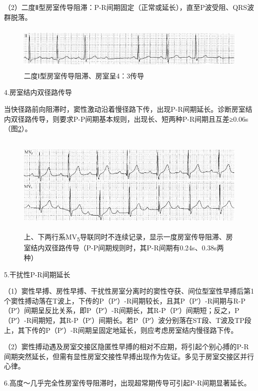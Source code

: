 （2）二度Ⅱ型房室传导阻滞：P-R间期固定（正常或延长），直至P波受阻、QRS波群脱落。

\begin{figure}[!htbp]
 \centering
 \includegraphics[width=5.58333in,height=0.83333in]{./images/Image00045.jpg}
 \captionsetup{justification=centering}
 \caption{二度Ⅰ型房室传导阻滞、房室呈4：3传导}
 \label{fig2-10}
  \end{figure} 

4.房室结内双径路传导

当快径路前向阻滞时，窦性激动沿着慢径路下传，出现P-R间期延长。诊断房室结内双径路传导，则要求P-P间期基本规则，出现长、短两种P-R间期且互差≥0.06s（图\ref{fig2-11}）。

\begin{figure}[!htbp]
 \centering
 \includegraphics[width=5.58333in,height=1.875in]{./images/Image00046.jpg}
 \captionsetup{justification=centering}
 \caption{上、下两行系MV\textsubscript{5}导联同时不连续记录，显示一度房室传导阻滞、房室结内双径路传导（P-P间期规则时，其P-R间期有0.24s、0.38s两种）}
 \label{fig2-11}
  \end{figure} 


5.干扰性P-R间期延长

（1）窦性早搏、房性早搏、干扰性房室分离时的窦性夺获、间位型室性早搏后第1个窦性搏动落在T波上，下传的P（P′）-R间期较长，且其P（P′）-R间期与R-P（P′）间期呈反比关系，即P（P′）-R间期长，其R-P（P′）间期短；反之，P（P′）-R间期短，其R-P（P′）间期长。若P（P′）波分别落在ST段、T波及TP段上，其下传的P（P′）-R间期呈固定地延长，则应考虑房室结内慢径路下传。

（2）窦性搏动遇及房室交接区隐匿性早搏的相对不应期，将引起个别心搏的P-R间期突然延长，但需有显性房室交接性早搏出现作为佐证。多见于房室交接区并行心律。

6.高度～几乎完全性房室传导阻滞时，出现超常期传导可引起P-R间期显著延长。

